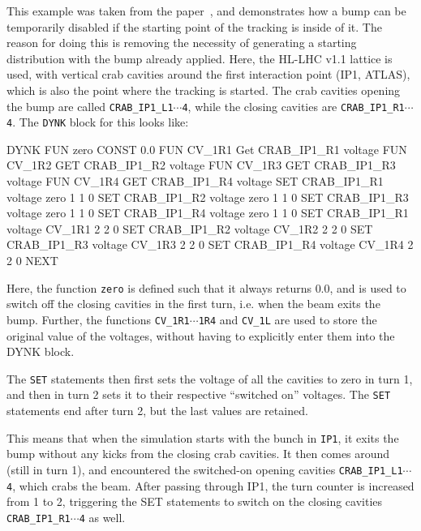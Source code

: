 This example was taken from the paper~\cite{DYNKpaper}, and demonstrates how a bump can be temporarily disabled if the starting point of the tracking is inside of it.
The reason for doing this is removing the necessity of generating a starting distribution with the bump already applied.
Here, the HL-LHC v1.1 lattice is used, with vertical crab cavities around the first interaction point (IP1, ATLAS), which is also the point where the tracking is started.
The crab cavities opening the bump are called \texttt{CRAB\_IP1\_L1$\cdots$4}, while the closing cavities are \texttt{CRAB\_IP1\_R1$\cdots$4}.
The \texttt{DYNK} block for this looks like:
\begin{cverbatim}
DYNK
  FUN zero CONST 0.0
  FUN CV_1R1 Get CRAB_IP1_R1 voltage
  FUN CV_1R2 GET CRAB_IP1_R2 voltage
  FUN CV_1R3 GET CRAB_IP1_R3 voltage
  FUN CV_1R4 GET CRAB_IP1_R4 voltage
  SET CRAB_IP1_R1 voltage zero 1 1 0
  SET CRAB_IP1_R2 voltage zero 1 1 0
  SET CRAB_IP1_R3 voltage zero 1 1 0
  SET CRAB_IP1_R4 voltage zero 1 1 0
  SET CRAB_IP1_R1 voltage CV_1R1 2 2 0
  SET CRAB_IP1_R2 voltage CV_1R2 2 2 0
  SET CRAB_IP1_R3 voltage CV_1R3 2 2 0
  SET CRAB_IP1_R4 voltage CV_1R4 2 2 0
NEXT
\end{cverbatim}

Here, the function \texttt{zero} is defined such that it always returns $0.0$, and is used to switch off the closing cavities in the first turn, i.e. when the beam exits the bump.
Further, the functions \texttt{CV\_1R1$\cdots$1R4} and \texttt{CV\_1L} are used to store the original value of the voltages, without having to explicitly enter them into the DYNK block.

The \texttt{SET} statements then first sets the voltage of all the cavities to zero in turn 1, and then in turn 2 sets it to their respective ``switched on'' voltages.
The \texttt{SET} statements end after turn 2, but the last values are retained.

This means that when the simulation starts with the bunch in \texttt{IP1}, it exits the bump without any kicks from the closing crab cavities.
It then comes around (still in turn 1), and encountered the switched-on opening cavities \texttt{CRAB\_IP1\_L1$\cdots$4}, which crabs the beam.
After passing through IP1, the turn counter is increased from 1 to 2, triggering the SET statements to switch on the closing cavities \texttt{CRAB\_IP1\_R1$\cdots$4} as well.

